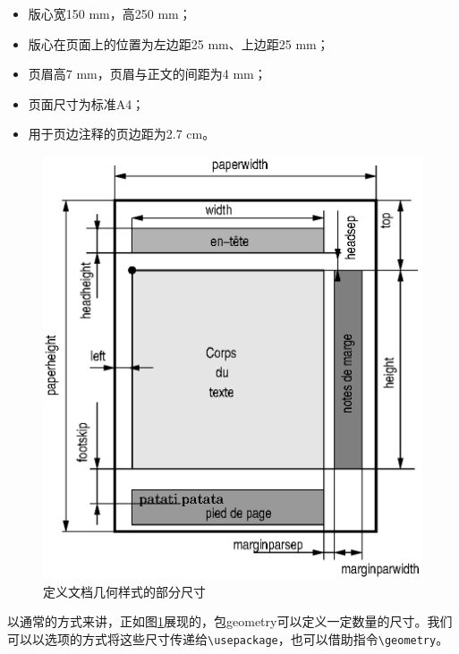 \begin{itemize}
    \item 版心宽150 mm，高250 mm；
    \item 版心在页面上的位置为左边距25 mm、上边距25 mm；
    \item 页眉高7 mm，页眉与正文的间距为4 mm；
    \item 页面尺寸为标准A4；
    \item 用于页边注释的页边距为2.7 cm。
\end{itemize}

\begin{figure}[ht]
    \centering
    \includegraphics{img/geometry}
    \caption{定义文档几何样式的部分尺寸}
    \label{fig:10.1}
\end{figure}

以通常的方式来讲，正如图\ref{fig:10.1}展现的，包\textsf{geometry}可以定义一定数量的尺寸。我们可以以选项的方式将这些尺寸传递给\verb|\usepackage|，也可以借助指令\verb|\geometry|。


